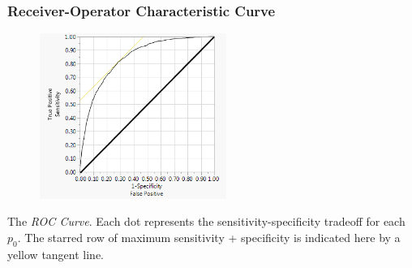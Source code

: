 \documentclass[handout]{beamer}
\begin{document}
\begin{frame}\frametitle{Receiver-Operator Characteristic Curve}

\vspace{-0.2cm}
\begin{figure}
\centering
\hspace{-0.5cm}\includegraphics[width=2.4in]{roc_curve.png}
\end{figure}

\small
\vspace{-0.3cm}
The \emph{ROC Curve}. Each dot represents the sensitivity-specificity tradeoff for each $p_0$. \pause The starred row of maximum sensitivity + specificity is indicated here by a yellow tangent line. %

\end{frame}
\end{document}
